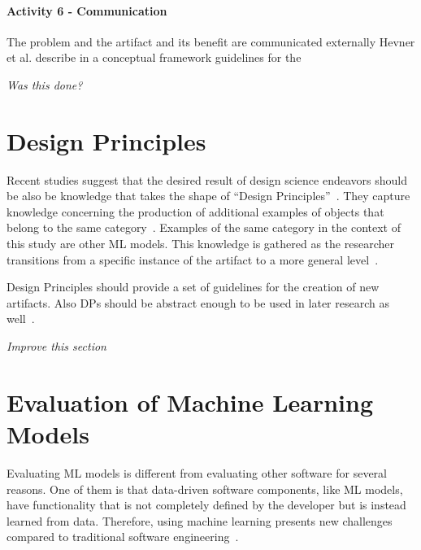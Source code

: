 \paragraph{Activity 6 - Communication}
The problem and the artifact and its benefit are communicated externally
\cite[p. 56]{peffers_designscienceresearch_2007}
Hevner et al. describe in a conceptual framework guidelines for the

\textit{Was this done?}


\section{Design Principles}\label{sec:design-principles}


Recent studies suggest that the desired result of design science endeavors should be also be knowledge that takes the
shape of
``Design Principles''~\cite{baskerville2010explanatory, sein2011action, gregor_positioningpresentingdesign_2013}.
They capture knowledge concerning the production of additional examples of objects that belong to the same
category~\cite[p. 39]{sein2011action}.
Examples of the same category in the context of this study are other \ac{ML} models.
This knowledge is gathered as the researcher transitions from a specific instance of the
artifact to a more general level~\cite[p. 37]{chandra2016making}.

Design Principles should provide a set of guidelines for the creation of new artifacts.
Also DPs should be abstract enough to be used in later research as well~\cite[p. 37]{sein2011action}.

\textit{Improve this section}


\section{Evaluation of Machine Learning Models}\label{sec:evaluation-of-machine-learning-models}
Evaluating \ac{ML} models is different from evaluating other software for several reasons.
One of them is that data-driven software components, like \ac{ML} models, have functionality that
is not completely defined by the developer but is instead learned from data.
Therefore, using machine learning presents new challenges compared to traditional software
engineering~\cite[p. 2]{siebert2022construction}.

